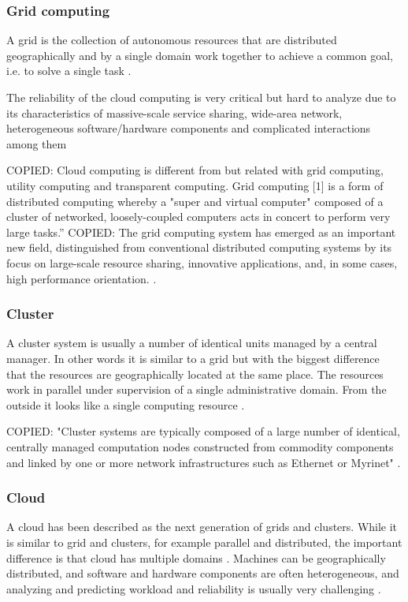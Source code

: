\documentclass{cslthse-msc}
\begin{document}
\subsubsection{Grid computing}
A grid is the collection of autonomous resources that are distributed geographically and by a single domain work together to achieve a common goal, i.e. to solve a single task \cite{compStudyLoadAndCloud} \cite{relAndPerfGridServices}.

The reliability of the cloud computing is very critical but hard to analyze due to its characteristics of massive-scale service sharing, wide-area network, heterogeneous software/hardware components and complicated interactions among them \cite{cloudServiceRel}

COPIED: Cloud computing is different from but related with grid computing, utility computing and transparent computing. Grid computing [1] is a form of distributed computing whereby a "super and virtual computer" composed of a cluster of networked, loosely-coupled computers acts in concert to perform very large tasks.”
COPIED:
The grid computing system has emerged as an important new field, distinguished from conventional distributed computing systems by its focus on large-scale resource sharing, innovative applications, and, in some cases, high performance orientation. \cite{hierarchicalRelModeling}.

\subsubsection{Cluster}
A cluster system is usually a number of identical units managed by a central manager. In other words it is similar to a grid but with the biggest difference that the resources are geographically located at the same place. The resources work in parallel under supervision of a single administrative domain. From the outside it looks like a single computing resource \cite{compStudyLoadAndCloud}. 

COPIED: "Cluster systems are typically composed of a large number of identical, centrally managed computation nodes constructed from commodity components  and linked by one or more network infrastructures such as Ethernet or Myrinet" \cite{surveyFaultParallel}.

\subsubsection{Cloud}
A cloud has been described as the next generation of grids and clusters. While it is similar to grid and clusters, for example parallel and distributed, the important difference is that cloud has multiple domains \cite{compStudyLoadAndCloud}. Machines can be geographically distributed, and software and hardware components are often heterogeneous, and analyzing and predicting workload and reliability is usually very challenging \cite{surveyReliabilityDistr}. 
\end{document}
